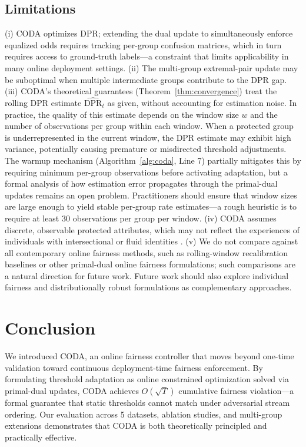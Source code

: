 \documentclass[letterpaper]{article} %
\theoremstyle{definition}
\begin{document}
\subsection{Limitations}
(i) CODA optimizes DPR; extending the dual update to simultaneously enforce equalized odds requires tracking per-group confusion matrices, which in turn requires access to ground-truth labels---a constraint that limits applicability in many online deployment settings. (ii) The multi-group extremal-pair update may be suboptimal when multiple intermediate groups contribute to the DPR gap. (iii) CODA's theoretical guarantees (Theorem~\ref{thm:convergence}) treat the rolling DPR estimate $\widehat{\text{DPR}}_t$ as given, without accounting for estimation noise. In practice, the quality of this estimate depends on the window size $w$ and the number of observations per group within each window. When a protected group is underrepresented in the current window, the DPR estimate may exhibit high variance, potentially causing premature or misdirected threshold adjustments. The warmup mechanism (Algorithm~\ref{alg:coda}, Line 7) partially mitigates this by requiring minimum per-group observations before activating adaptation, but a formal analysis of how estimation error propagates through the primal-dual updates remains an open problem. Practitioners should ensure that window sizes are large enough to yield stable per-group rate estimates---a rough heuristic is to require at least 30 observations per group per window. (iv) CODA assumes discrete, observable protected attributes, which may not reflect the experiences of individuals with intersectional or fluid identities \cite{crenshaw1989demarginalizing}. (v) We do not compare against all contemporary online fairness methods, such as rolling-window recalibration baselines or other primal-dual online fairness formulations; such comparisons are a natural direction for future work. Future work should also explore individual fairness \cite{dwork2012fairness} and distributionally robust formulations as complementary approaches.

\section{Conclusion}
\label{sec:conclusion}

We introduced CODA, an online fairness controller that moves beyond one-time validation toward continuous deployment-time fairness enforcement. By formulating threshold adaptation as online constrained optimization solved via primal-dual updates, CODA achieves $O(\sqrt{T})$ cumulative fairness violation---a formal guarantee that static thresholds cannot match under adversarial stream ordering. Our evaluation across 5 datasets, ablation studies, and multi-group extensions demonstrates that CODA is both theoretically principled and practically effective.
\end{document}
